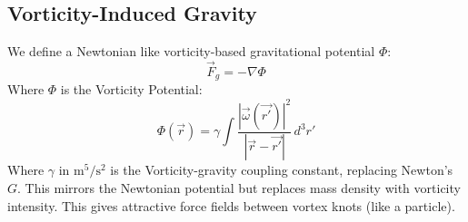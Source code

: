 \documentclass[aps,preprint,superscriptaddress]{revtex4}
\begin{document}
    \subsection*{Vorticity-Induced Gravity}
    We define a Newtonian like vorticity-based gravitational potential $\Phi$:
    \begin{equation}
        \vec{F}_g = -\nabla \Phi\label{eq:Vorticity-Induced-Gravity}
    \end{equation}
    Where $\Phi$ is the Vorticity Potential:
    \begin{equation}
        \Phi(\vec{r}) = \gamma \int \frac{|\vec{\omega}(\vec{r'})|^2}{|\vec{r} - \vec{r'}|} \, d^3r'\label{eq:Vorticity_Potential}
    \end{equation}
    Where \textbf{$\gamma$} in \textbf{$\text{m}^5 / \text{s}^{2}$} is the Vorticity-gravity coupling constant, replacing Newton's $G$. This mirrors the Newtonian potential but replaces mass density with vorticity intensity. This gives attractive force fields between vortex knots (like a particle).


    

    

    

    

    

    

    


    
    


    \appendix \label{sec:Part-6}
    \label{appendix:1}
    \label{appendix:2}
\end{document}
